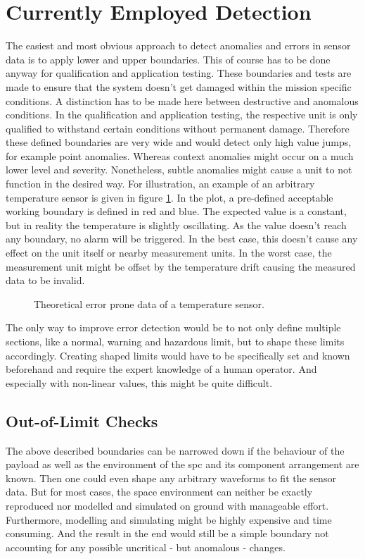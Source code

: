 \section{Currently Employed Detection}
The easiest and most obvious approach to detect anomalies and errors in sensor data is to apply lower and upper boundaries. This of course has to be done anyway for qualification and application testing. These boundaries and tests are made to ensure that the system doesn't get damaged within the mission specific conditions. A distinction has to be made here between destructive and anomalous conditions. In the qualification and application testing, the respective unit is only qualified to withstand certain conditions without permanent damage. Therefore these defined boundaries are very wide and would detect only high value jumps, for example point anomalies. Whereas context anomalies might occur on a much lower level and severity. Nonetheless, subtle anomalies might cause a unit to not function in the desired way. \newline
For illustration, an example of an arbitrary temperature sensor is given in figure \ref{f:simple-boundary}. In the plot, a pre-defined acceptable working boundary is defined in red and blue. The expected value is a constant, but in reality the temperature is slightly oscillating. As the value doesn't reach any boundary, no alarm will be triggered. In the best case, this doesn't cause any effect on the unit itself or nearby measurement units. In the worst case, the measurement unit might be offset by the temperature drift causing the measured data to be invalid.

\begin{figure}[H]
\centering

\caption{Theoretical error prone data of a temperature sensor.}
\label{f:simple-boundary}
\end{figure}

The only way to improve error detection would be to not only define multiple sections, like a normal, warning and hazardous limit, but to shape these limits accordingly. Creating shaped limits would have to be specifically set and known beforehand and require the expert knowledge of a human operator. And especially with non-linear values, this might be quite difficult.

\subsection{Out-of-Limit Checks}
The above described boundaries can be narrowed down if the behaviour of the payload as well as the environment of the \ac{spc} and its component arrangement are known. Then one could even shape any arbitrary waveforms to fit the sensor data. But for most cases, the space environment can neither be exactly reproduced nor modelled and simulated on ground with manageable effort. Furthermore, modelling and simulating might be highly expensive and time consuming. And the result in the end would still be a simple boundary not accounting for any possible uncritical - but anomalous - changes.

